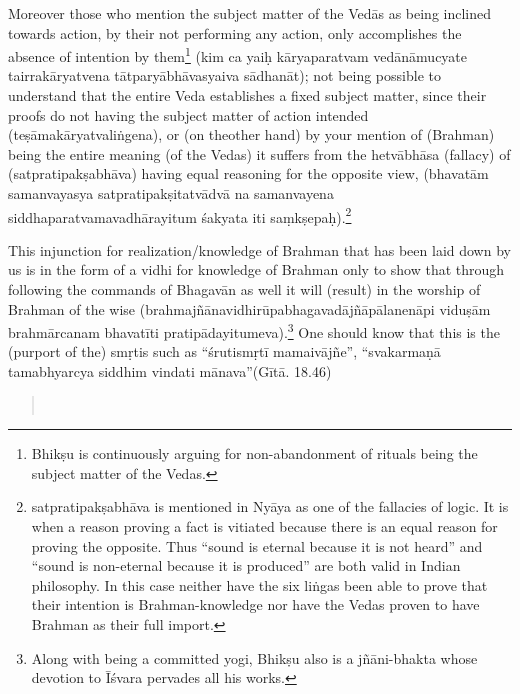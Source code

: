 Moreover those who mention the subject matter of the Vedās as being inclined towards action,  by their not performing any action, only accomplishes the absence of intention by them\footnote{Bhikṣu is continuously arguing for non-abandonment of rituals being the subject matter of the Vedas.} (kim ca yaiḥ kāryaparatvam vedānāmucyate tairrakāryatvena tātparyābhāvasyaiva sādhanāt); not being possible to understand that the entire Veda establishes a fixed subject matter, since their proofs do not having the subject matter of action intended (teṣāmakāryatvaliṅgena),  or (on the\break other hand) by your mention of (Brahman) being the entire meaning (of the Vedas) it suffers from the hetvābhāsa (fallacy) of (satpratipakṣabhāva) having equal reasoning for the opposite view,  (bhavatām samanvayasya satpratipakṣitatvādvā na samanvayena siddhaparatvamavadhārayitum śakyata iti saṃkṣepaḥ).\footnote{satpratipakṣabhāva is mentioned in Nyāya as one of the fallacies of logic. It is when a reason proving a fact is vitiated because there is an equal reason for proving the opposite. Thus “sound is eternal because it is not heard” and “sound is non-eternal because it is produced” are both valid in Indian philosophy. In this case neither have the six liṅgas been able to prove that their intention is Brahman-knowledge nor have the Vedas proven to have Brahman as their full import.} 

This injunction for realization/knowledge of Brahman that has been laid down by us is in the form of a vidhi for knowledge of Brahman  only to show that through following the commands of Bhagavān as well it will (result) in the worship of Brahman of the wise (brahmajñānavidhirūpabhagavadājñāpālanenāpi viduṣām brahmārcanam bhava\-tīti pratipādayitumeva).\footnote{Along with being a committed yogi, Bhikṣu also is a jñāni-bhakta whose devotion to Īśvara pervades all his works.} One should know that this is the (purport of the) smṛtis such as “śrutismṛtī mamaivājñe”, “svakarmaṇā tamabhyarcya siddhim vindati mānava”(Gītā. 18.46)

\begin{verse}
\\
\end{verse}

